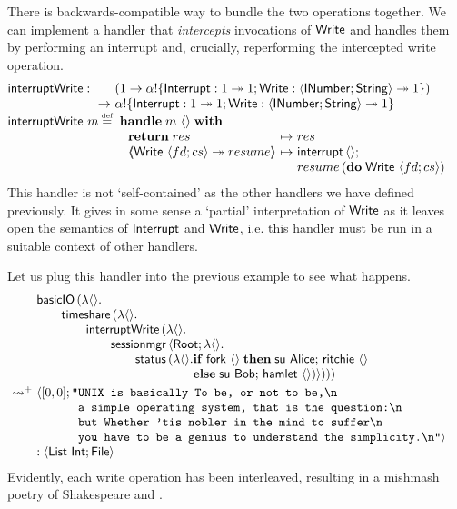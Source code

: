 \documentclass[12pt,phd,lfcs,twoside,openright,logo,leftchapter,normalheadings]{infthesis}
\theoremstyle{plain}
\theoremstyle{definition}
\begin{document}
There is backwards-compatible way to bundle the two operations
together. We can implement a handler that \emph{intercepts}
invocations of $\mathsf{Write}$ and handles them by performing an interrupt
and, crucially, reperforming the intercepted write operation.
%
\[
  \bl
  \dec{interruptWrite} :
    \ba[t]{@{~}l@{~}l}
       &(\UnitType \to \alpha \eff \{\Interrupt : \UnitType \opto \UnitType;\Write : \Record{\UFD;\String} \opto \UnitType\})\\
    \to& \alpha \eff \{\Interrupt : \UnitType \opto \UnitType;\Write : \Record{\UFD;\String} \opto \UnitType\}
    \ea\\
  \dec{interruptWrite}~m \defas
    \ba[t]{@{~}l}
      \Handle\;m~\Unit\;\With\\
        ~\ba{@{~}l@{~}c@{~}l}
           \Return\;res &\mapsto& res\\
           \OpCase{\Write}{\Record{fd;cs}}{resume} &\mapsto&
              \ba[t]{@{}l}
                \interrupt\,\Unit;\\
                resume\,(\Do\;\Write~\Record{fd;cs})
              \ea
         \ea
    \ea
  \el
\]
%
This handler is not `self-contained' as the other handlers we have
defined previously. It gives in some sense a `partial' interpretation
of $\mathsf{Write}$ as it leaves open the semantics of $\mathsf{Interrupt}$ and
$\mathsf{Write}$, i.e. this handler must be run in a suitable context of other
handlers.

Let us plug this handler into the previous example to see what
happens.
%
\[
  \ba{@{~}l@{~}l}
    &\bl
    \basicIO\,(\lambda\Unit.\\
         \qquad\timeshare\,(\lambda\Unit.\\
         \qquad\qquad\dec{interruptWrite}\,(\lambda\Unit.\\
         \qquad\qquad\qquad\sessionmgr\,\Record{\Root;\lambda\Unit.\\
         \qquad\qquad\qquad\qquad\status\,(\lambda\Unit.
                 \ba[t]{@{}l}
                   \If\;\fork~\Unit\;\Then\;
                       \su~\Alice;\,
                       \quoteRitchie~\Unit\\
                   \Else\;
                       \su~\Bob;\,
                       \quoteHamlet~\Unit)})))
                 \ea
     \el \smallskip\\
     \reducesto^+&
     \bl
      \Record{
       \ba[t]{@{}l}
         [0, 0];
         \texttt{"}\ba[t]{@{}l}
         \texttt{UNIX is basically To be, or not to be,\nl{}}\\
         \texttt{a simple operating system, that is the question:\nl{}}\\
         \texttt{but Whether 'tis nobler in the mind to suffer\nl{}}\\
         \texttt{you have to be a genius to understand the simplicity.\nl{}"}}
         \ea
       \ea\\
       : \Record{\List~\Int; \UFile}
     \el
  \ea
\]
%
Evidently, each write operation has been interleaved, resulting in a
mishmash poetry of Shakespeare and \UNIX{}.
%
\end{document}

